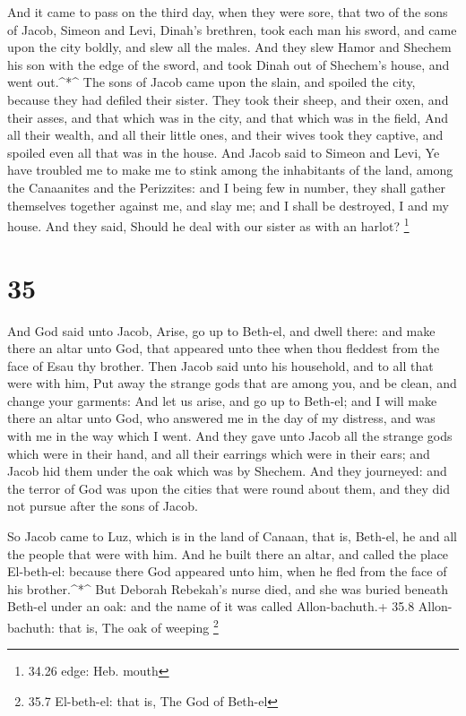  And it came to pass on the third day, when they were sore,
that two of the sons of Jacob, Simeon and Levi, Dinah's brethren, took
each man his sword, and came upon the city boldly, and slew all the
males.  And they slew Hamor and Shechem his son with the
edge of the sword, and took Dinah out of Shechem's house, and went
out.\^{}*\^{}  The sons of Jacob came upon the slain, and
spoiled the city, because they had defiled their sister. 
They took their sheep, and their oxen, and their asses, and that which
was in the city, and that which was in the field,  And all
their wealth, and all their little ones, and their wives took they
captive, and spoiled even all that was in the house.  And
Jacob said to Simeon and Levi, Ye have troubled me to make me to stink
among the inhabitants of the land, among the Canaanites and the
Perizzites: and I being few in number, they shall gather themselves
together against me, and slay me; and I shall be destroyed, I and my
house.  And they said, Should he deal with our sister as
with an harlot? \footnote{34.26 edge: Heb. mouth}

\hypertarget{section-34}{%
\section{35}\label{section-34}}

 And God said unto Jacob, Arise, go up to Beth-el, and dwell
there: and make there an altar unto God, that appeared unto thee when
thou fleddest from the face of Esau thy brother.  Then Jacob
said unto his household, and to all that were with him, Put away the
strange gods that are among you, and be clean, and change your garments:
 And let us arise, and go up to Beth-el; and I will make
there an altar unto God, who answered me in the day of my distress, and
was with me in the way which I went.  And they gave unto
Jacob all the strange gods which were in their hand, and all their
earrings which were in their ears; and Jacob hid them under the oak
which was by Shechem.  And they journeyed: and the terror of
God was upon the cities that were round about them, and they did not
pursue after the sons of Jacob.

 So Jacob came to Luz, which is in the land of Canaan, that
is, Beth-el, he and all the people that were with him.  And
he built there an altar, and called the place El-beth-el: because there
God appeared unto him, when he fled from the face of his
brother.\^{}*\^{}  But Deborah Rebekah's nurse died, and she
was buried beneath Beth-el under an oak: and the name of it was called
Allon-bachuth.+ 35.8 Allon-bachuth: that is, The oak of weeping
\footnote{35.7 El-beth-el: that is, The God of Beth-el}

